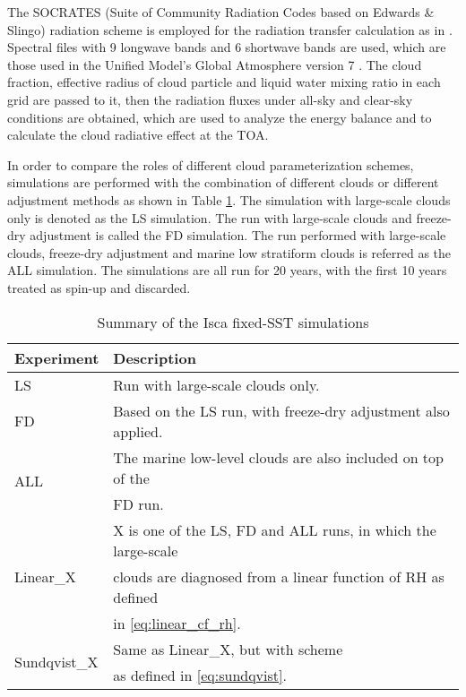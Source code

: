 The SOCRATES (Suite of Community Radiation Codes based on Edwards \& Slingo) radiation scheme  \citep{Edwards1996, Manners2015} is employed for the radiation transfer calculation as in \citet{Thomson2019}. Spectral files with 9 longwave bands and 6 shortwave bands are used, which are those used in the Unified Model's Global Atmosphere version 7 \citep{Walters2019}. The cloud fraction, effective radius of cloud particle and liquid water mixing ratio in each grid are passed to it, then the radiation fluxes under all-sky and clear-sky conditions are obtained, which are used to analyze the energy balance and to calculate the cloud radiative effect \citep{Ramanathan1989, Li2017} at the TOA.

In order to compare the roles of different cloud parameterization schemes, simulations are performed with the combination of different clouds or different adjustment methods as shown in Table \ref{tab:exps}. The simulation with large-scale clouds only is denoted as the LS simulation. The run with large-scale clouds and freeze-dry adjustment is called the FD simulation. The run performed with large-scale clouds, freeze-dry adjustment and marine low stratiform clouds is referred as the ALL simulation. The simulations are all run for 20 years, with the first 10 years treated as spin-up and discarded.

\begin{table}
	\caption{Summary of the Isca fixed-SST simulations}
	\vspace{0.5em}
	\centering
	\renewcommand{\arraystretch}{1.3}
	\begin{tabular}{ll}
		\hline
		Experiment & Description \\
		\hline
		LS  & Run with large-scale clouds only. \\ 
		FD  & Based on the LS run, with freeze-dry adjustment also applied. \\ 
		\multirow{2}{*}{ALL} & The marine low-level clouds are also included on top of the \\
		    & FD run.  \\
		\multirow{3}{*}{Linear\_X} 	&  X is one of the LS, FD and ALL runs, in which the large-scale \\
		& clouds are diagnosed from a linear function of RH as defined\\
		& in \eqref{eq:linear_cf_rh}. \\
		\multirow{2}{*}{Sundqvist\_X} & Same as Linear\_X, but with \citet{Sundqvist1989} scheme\\ 
		& as defined in \eqref{eq:sundqvist}.\\
		\hline
	\end{tabular}
	\label{tab:exps}
\end{table}

